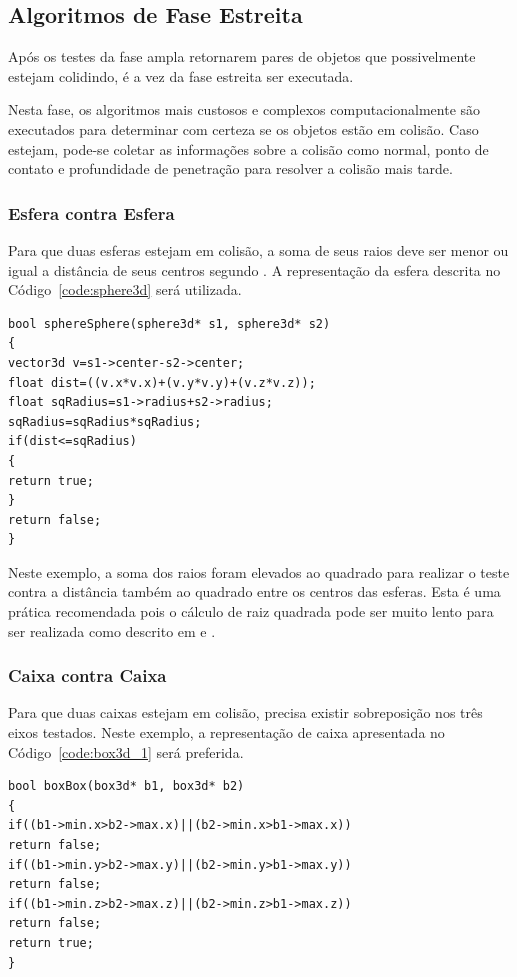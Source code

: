 \subsection{Algoritmos de Fase Estreita}

Após  os testes da fase ampla retornarem pares de objetos que possivelmente
estejam colidindo, é a vez da fase estreita ser executada.

Nesta fase, os algoritmos mais custosos e complexos computacionalmente são
executados para determinar com certeza se os objetos estão em colisão.
Caso estejam, pode-se coletar as informações sobre a colisão como normal, ponto
de contato e profundidade de penetração para resolver a colisão mais tarde.

\subsubsection{Esfera contra Esfera}

Para que duas esferas estejam em colisão, a soma de seus raios deve ser menor
ou igual a distância de seus centros segundo .
A representação da esfera descrita no Código~\ref{code:sphere3d} será utilizada.

\begin{lstlisting}[frame=single,caption=Colisão entre esferas\label{code:collisionSphereSphere}]
bool sphereSphere(sphere3d* s1, sphere3d* s2)
{
vector3d v=s1->center-s2->center;
float dist=((v.x*v.x)+(v.y*v.y)+(v.z*v.z));
float sqRadius=s1->radius+s2->radius;
sqRadius=sqRadius*sqRadius;
if(dist<=sqRadius)
{
return true;
}
return false;
}
\end{lstlisting}

Neste exemplo, a soma dos raios foram elevados ao quadrado para realizar o
teste contra a distância também ao quadrado entre os centros das esferas.
Esta é uma prática recomendada pois o cálculo de raiz quadrada pode ser muito
lento para ser realizada como descrito em  e .

\subsubsection{Caixa contra Caixa}

Para que duas caixas estejam em colisão, precisa existir sobreposição nos três
eixos testados.
Neste exemplo, a representação de caixa apresentada no Código~\ref{code:box3d_1} será preferida.

\begin{lstlisting}[frame=single,caption=Colisão entre caixas\label{code:collisionBoxBox}]
bool boxBox(box3d* b1, box3d* b2)
{
if((b1->min.x>b2->max.x)||(b2->min.x>b1->max.x))
return false;
if((b1->min.y>b2->max.y)||(b2->min.y>b1->max.y))
return false;
if((b1->min.z>b2->max.z)||(b2->min.z>b1->max.z))
return false;
return true;
}
\end{lstlisting}

